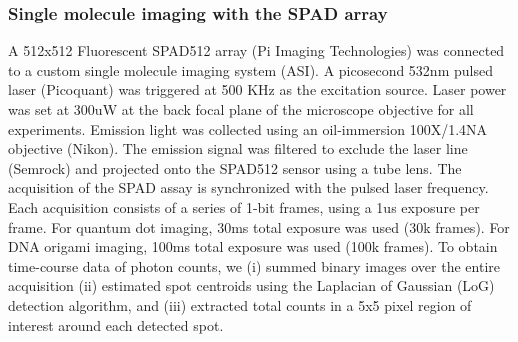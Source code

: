\subsubsection{Single molecule imaging with the SPAD array}

A 512x512 Fluorescent SPAD512 array (Pi Imaging Technologies) was connected to a custom single molecule imaging system (ASI). A picosecond 532nm pulsed laser (Picoquant) was triggered at 500 KHz as the excitation source. Laser power was set at 300uW at the back focal plane of the microscope objective for all experiments. Emission light was collected using an oil-immersion 100X/1.4NA objective (Nikon). The emission signal was filtered to exclude the laser line (Semrock) and projected onto the SPAD512 sensor using a tube lens. The acquisition of the SPAD assay is synchronized with the pulsed laser frequency. Each acquisition consists of a series of 1-bit frames, using a 1us exposure per frame. For quantum dot imaging, 30ms total exposure was used (30k frames). For DNA origami imaging, 100ms total exposure was used (100k frames). To obtain time-course data of photon counts, we (i) summed binary images over the entire acquisition (ii) estimated spot centroids using the Laplacian of Gaussian (LoG) detection algorithm, and (iii) extracted total counts in a 5x5 pixel region of interest around each detected spot. 





